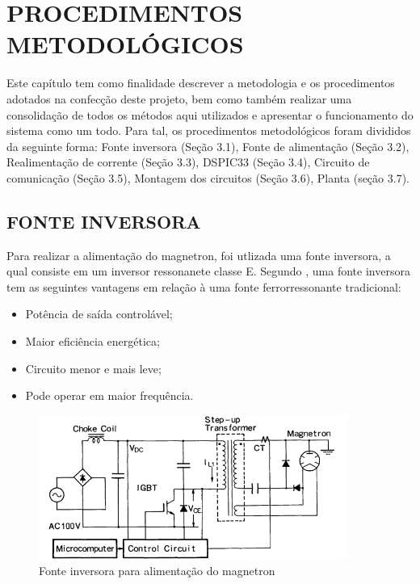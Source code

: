 \chapter{PROCEDIMENTOS METODOLÓGICOS}
\label{chap:metodologia}

Este capítulo tem como finalidade descrever a metodologia e os procedimentos adotados na confecção deste projeto, bem como também realizar uma consolidação de todos os métodos aqui utilizados e apresentar o funcionamento do sistema como um todo. Para tal, os procedimentos metodológicos foram divididos da seguinte forma: Fonte inversora (Seção 3.1), Fonte de alimentação (Seção 3.2),  Realimentação de corrente (Seção 3.3), DSPIC33  (Seção 3.4), Circuito de comunicação (Seção 3.5), Montagem dos circuitos (Seção 3.6), Planta (seção 3.7).

\section{FONTE INVERSORA}
\label{sec:fonteInversora}

Para realizar a alimentação do magnetron, foi utlizada uma fonte inversora, a qual consiste em um inversor ressonanete classe E. Segundo , uma fonte inversora tem as seguintes vantagens em relação à uma fonte ferrorressonante tradicional:
\begin{itemize}
    \item Potência de saída controlável;
    \item Maior eficiência energética;
    \item Circuito menor e mais leve;
    \item Pode operar em maior frequência.
\end{itemize} 

\begin{figure}[!htb]
    \centering
    \includegraphics[width=0.9\textwidth]{./dados/figuras/font_inverter}
    \caption{Fonte inversora para alimentação do magnetron}
    \label{fig:figura-inverter}
\end{figure}

